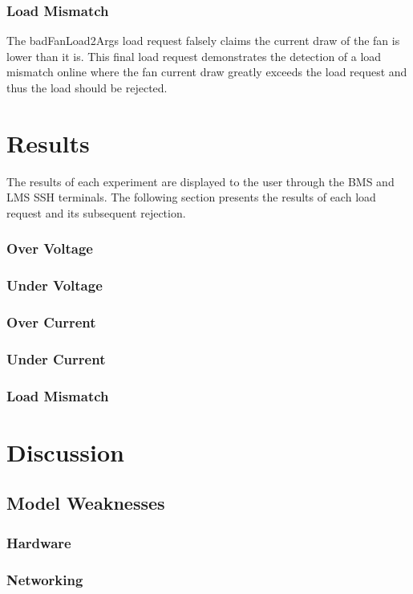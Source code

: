 \documentclass[11pt,conference,draftcls,onecolumn]{IEEEtran}
\begin{document}
\subsubsection{Load Mismatch}
The badFanLoad2Args load request falsely claims the current draw of the fan is lower than it is.
This final load request demonstrates the detection of a load mismatch online where the fan current draw greatly exceeds the load request and thus the load should be rejected.

\section{Results}\label{sec:results}
The results of each experiment are displayed to the user through the BMS and LMS SSH terminals.
The following section presents the results of each load request and its subsequent rejection.

\subsubsection{Over Voltage}


\subsubsection{Under Voltage}
\subsubsection{Over Current}
\subsubsection{Under Current}
\subsubsection{Load Mismatch}

\section{Discussion}\label{sec:discussion}
\subsection{Model Weaknesses}
\subsubsection{Hardware}
\subsubsection{Networking}
\end{document}
